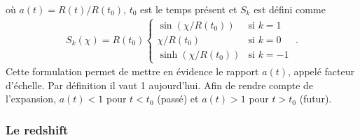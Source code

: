 \documentclass[11pt, twoside, a4paper, openright]{report}
\begin{document}
où $a(t) = R(t) / R(t_0)$,  $t_0$ est le temps présent et $S_{k}$ est défini comme
\begin{align}
  S_{k}(\chi) = R(t_0) \left\{
    \begin{array}{ll}
      \sin(\chi / R(t_0)) & \mbox{si } k = 1 \\
      \chi / R(t_0) & \textrm{si } k = 0 \\
      \sinh(\chi / R(t_0)) & \mbox{si } k = -1
    \end{array}
\right.  \; .
\end{align}
Cette formulation permet de mettre en évidence le rapport $a(t)$, appelé facteur d'échelle. Par définition il vaut 1 aujourd'hui. Afin de rendre compte de l'expansion, $a(t) < 1$ pour $t < t_0$ (passé) et $a(t) > 1$ pour $t > t_0$ (futur).

\subsubsection{Le redshift}
\label{par:redshift}
\end{document}
